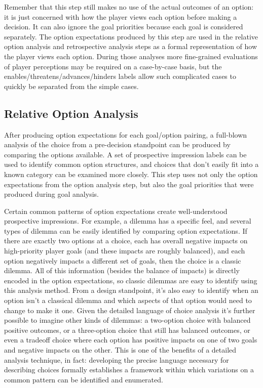 Remember that this step still makes no use of the actual outcomes of an option: it is just concerned with how the player views each option before making a decision.
%
It can also ignore the goal priorities because each goal is considered separately.
%
The option expectations produced by this step are used in the relative option analysis and retrospective analysis steps as a formal representation of how the player views each option.
%
During those analyses more fine-grained evaluations of player perceptions may be required on a case-by-case basis, but the enables/threatens/advances/hinders labels allow such complicated cases to quickly be separated from the simple cases.


\subsection{Relative Option Analysis}

\label{sec:cp-relative-option-analysis}

After producing option expectations for each goal/option pairing, a full-blown analysis of the choice from a pre-decision standpoint can be produced by comparing the options available.
%
A set of prospective impression labels can be used to identify common option structures, and choices that don't easily fit into a known category can be examined more closely.
%
This step uses not only the option expectations from the option analysis step, but also the goal priorities that were produced during goal analysis.


Certain common patterns of option expectations create well-understood prospective impressions.
%
For example, a dilemma has a specific feel, and several types of dilemma can be easily identified by comparing option expectations.
%
If there are exactly two options at a choice, each has overall negative impacts on high-priority player goals (and these impacts are roughly balanced), and each option negatively impacts a different set of goals, then the choice is a classic dilemma.
%
All of this information (besides the balance of impacts) is directly encoded in the option expectations, so classic dilemmas are easy to identify using this analysis method.
%
From a design standpoint, it's also easy to identify when an option isn't a classical dilemma and which aspects of that option would need to change to make it one.
%
Given the detailed language of choice analysis it's further possible to imagine other kinds of dilemmas: a two-option choice with balanced positive outcomes, or a three-option choice that still has balanced outcomes, or even a tradeoff choice where each option has positive impacts on one of two goals and negative impacts on the other.
%
This is one of the benefits of a detailed analysis technique, in fact: developing the precise language necessary for describing choices formally establishes a framework within which variations on a common pattern can be identified and enumerated.


